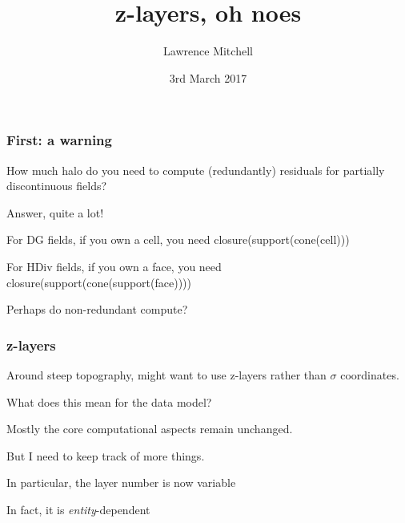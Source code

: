 \documentclass[presentation]{beamer}
\date{3rd March 2017}
\author{Lawrence Mitchell\inst{1}}
\institute{\inst{1}Departments of Computing and Mathematics, Imperial College London}
\title{z-layers, oh noes}
\begin{document}
\begin{frame}
  \frametitle{First: a warning}

  How much halo do you need to compute (redundantly) residuals for
  partially discontinuous fields?

  Answer, quite a lot!

  For DG fields, if you own a cell, you need closure(support(cone(cell)))

  For HDiv fields, if you own a face, you need
  closure(support(cone(support(face))))

  Perhaps do non-redundant compute?
\end{frame}

\begin{frame}
  \frametitle{z-layers}

  Around steep topography, might want to use z-layers rather than
  $\sigma$ coordinates.

  What does this mean for the data model?

  Mostly the core computational aspects remain unchanged.

  But I need to keep track of more things.

  In particular, the layer number is now variable

  In fact, it is \emph{entity}-dependent
\end{frame}

\begin{frame}[plain]
  \begin{columns}
    \begin{column}{\textwidth}
    \end{column}
  \end{columns}
\end{frame}
\end{document}

